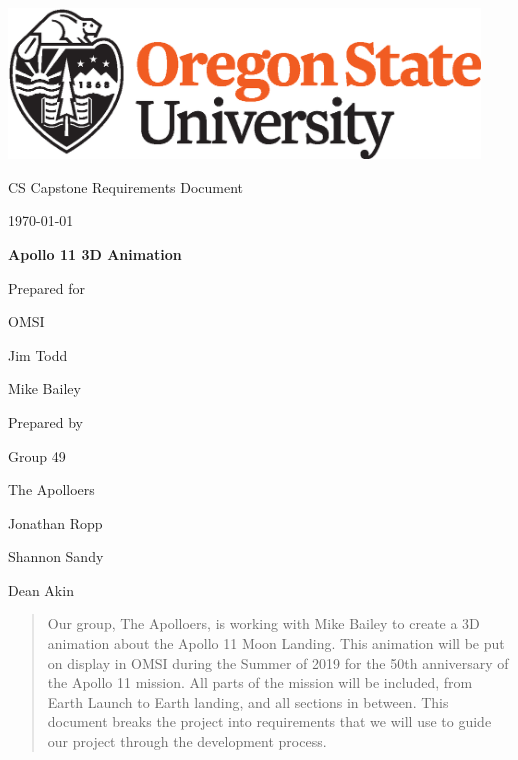 \documentclass[onecolumn, draftclsnofoot,10pt, compsoc]{IEEEtran}
\def \CapstoneTeamName{		    The Apolloers}
\def \CapstoneTeamNumber{		49}
\def \GroupMemberOne{			Jonathan Ropp}
\def \GroupMemberTwo{			Shannon Sandy}
\def \GroupMemberThree{			Dean Akin}
\def \CapstoneProjectName{		Apollo 11 3D Animation}
\def \CapstoneSponsorCompany{	OMSI}
\def \CapstoneSponsorPersona{	Jim Todd}
\def \CapstoneSponsorPersonb{	Mike Bailey}
\def \DocType{		
				Requirements Document
				}
\newcommand{\NameSigPair}[1]{\par
\makebox[2.75in][r]{#1} \hfil 	\makebox[3.25in]{\makebox[2.25in]{\hrulefill} \hfill		\makebox[.75in]{\hrulefill}}
\par\vspace{-12pt} \textit{\tiny\noindent
\makebox[2.75in]{} \hfil		\makebox[3.25in]{\makebox[2.25in][r]{Signature} \hfill	\makebox[.75in][r]{Date}}}}
\renewcommand{\NameSigPair}[1]{#1}
\begin{document}
\begin{titlepage}
    \begin{singlespace}
        \hfill 
        \includegraphics[height=4cm]{OSU_horizontal_2C_O_over_B.eps}   
        \par\vspace{.2in}
        \centering
        \scshape{
            \huge CS Capstone \DocType \par
            {\large\today}\par
            \vspace{.5in}
            \textbf{\Huge\CapstoneProjectName}\par
            \vfill
            {\large Prepared for}\par
            \Huge \CapstoneSponsorCompany\par
            \vspace{5pt}
            {\Large\NameSigPair{\CapstoneSponsorPersona}\par}
            {\Large\NameSigPair{\CapstoneSponsorPersonb}\par}
            {\large Prepared by }\par
            Group\CapstoneTeamNumber\par
            \CapstoneTeamName\par 
            \vspace{5pt}
            {\Large
                \NameSigPair{\GroupMemberOne}\par
                \NameSigPair{\GroupMemberTwo}\par
                \NameSigPair{\GroupMemberThree}\par
            }
            \vspace{20pt}
        }
        \begin{abstract}
        	Our group, The Apolloers, is working with Mike Bailey to create a 3D animation about the Apollo 11 Moon Landing. This animation will be put on display in OMSI during the Summer of 2019 for the 50th anniversary of the Apollo 11 mission. All parts of the mission will be included, from Earth Launch to Earth landing, and all sections in between. This document breaks the project into requirements that we will use to guide our project through the development process. 
        \end{abstract}     
    \end{singlespace}
\end{titlepage}
\newpage
{}
\tableofcontents
\clearpage
\end{document}

